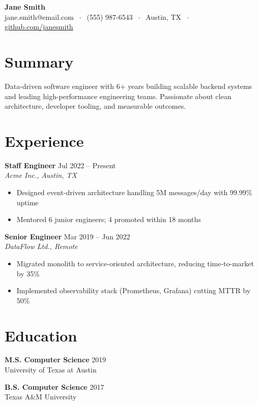 \documentclass[10pt,letterpaper]{article}
\begin{document}
{\centering
  {\Huge\bfseries\color{navyblue} Jane Smith}\\[5pt]
  {\small jane.smith@email.com $\;\cdot\;$ (555) 987-6543 $\;\cdot\;$ Austin, TX $\;\cdot\;$ \href{https://github.com/janesmith}{github.com/janesmith}}
  \par
}
\vspace{6pt}

\section{Summary}
Data-driven software engineer with 6+ years building scalable backend systems and leading high-performance engineering teams. Passionate about clean architecture, developer tooling, and measurable outcomes.

\section{Experience}

{\bfseries Staff Engineer} \hfill {\small Jul 2022 -- Present}\\
{\itshape Acme Inc., Austin, TX}
\begin{itemize}
  \item Designed event-driven architecture handling 5M messages/day with 99.99\% uptime
  \item Mentored 6 junior engineers; 4 promoted within 18 months
\end{itemize}

{\bfseries Senior Engineer} \hfill {\small Mar 2019 -- Jun 2022}\\
{\itshape DataFlow Ltd., Remote}
\begin{itemize}
  \item Migrated monolith to service-oriented architecture, reducing time-to-market by 35\%
  \item Implemented observability stack (Prometheus, Grafana) cutting MTTR by 50\%
\end{itemize}

\section{Education}

{\bfseries M.S. Computer Science} \hfill {\small 2019}\\
University of Texas at Austin

{\bfseries B.S. Computer Science} \hfill {\small 2017}\\
Texas A\&M University
\end{document}
